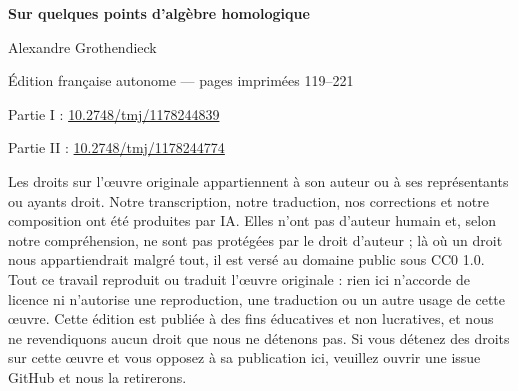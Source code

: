 \documentclass[10pt,twoside,openany]{book}
\begin{document}
\raggedbottom
\begin{titlepage}
\centering
\vspace*{0.18\textheight}
{\Huge\bfseries Sur quelques points d'algèbre homologique\par}
\vspace{1.5em}
{\Large Alexandre Grothendieck\par}
\vspace{2.5em}
  {\large Édition française autonome — pages imprimées 119--221\par}
\vfill
{\TohokuAuthorityLine\par}
{Partie I : \href{https://doi.org/10.2748/tmj/1178244839}{10.2748/tmj/1178244839}\par}
{Partie II : \href{https://doi.org/10.2748/tmj/1178244774}{10.2748/tmj/1178244774}\par}
\vspace{1.5em}
{\small\raggedright Les droits sur l'œuvre originale appartiennent à son auteur ou à ses représentants ou ayants droit. Notre transcription, notre traduction, nos corrections et notre composition ont été produites par IA. Elles n'ont pas d'auteur humain et, selon notre compréhension, ne sont pas protégées par le droit d'auteur ; là où un droit nous appartiendrait malgré tout, il est versé au domaine public sous CC0 1.0. Tout ce travail reproduit ou traduit l'œuvre originale : rien ici n'accorde de licence ni n'autorise une reproduction, une traduction ou un autre usage de cette œuvre. Cette édition est publiée à des fins éducatives et non lucratives, et nous ne revendiquons aucun droit que nous ne détenons pas. Si vous détenez des droits sur cette œuvre et vous opposez à sa publication ici, veuillez ouvrir une issue GitHub et nous la retirerons.\par}
\end{titlepage}
\end{document}
